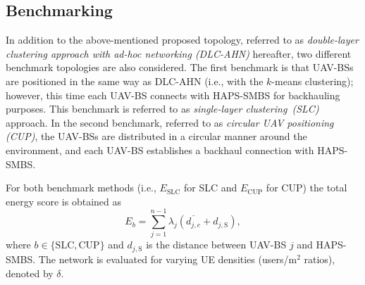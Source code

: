 \documentclass[conference, a4paper]{IEEEtran}
\begin{document}
\subsection{Benchmarking}
In addition to the above-mentioned proposed topology, referred to as \textit{double-layer clustering approach with ad-hoc networking (DLC-AHN)} hereafter, two different benchmark topologies are also considered.
The first benchmark is that UAV-BSs are positioned in the same way as DLC-AHN (i.e., with the $k$-means clustering); however, this time each UAV-BS connects with HAPS-SMBS for backhauling purposes. 
This benchmark is referred to as \textit{single-layer clustering~(SLC)} approach.
In the second benchmark, referred to as \textit{circular UAV positioning (CUP)}, the UAV-BSs are distributed in a circular manner around the environment, and each UAV-BS establishes a backhaul connection with HAPS-SMBS.

For both benchmark methods (i.e., $E_\text{SLC}$ for SLC and $E_\text{CUP}$ for CUP) the total energy score is obtained as
\begin{equation} \label{eq:energy_23}
   E_b = \sum_{j=1}^{n-1} \lambda_j ( \overline{d_{j,e}}+ d_{j,\text{S}}),
\end{equation}
where $b \in \{\text{SLC},\text{CUP}\}$ and $d_{j,\text{S}}$ is the distance between UAV-BS $j$ and HAPS-SMBS. 
The network is evaluated for varying UE densities (users/m$^2$ ratios), denoted by $\delta$. 
\end{document}
